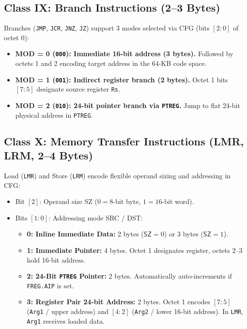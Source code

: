 \documentclass[11pt,a4paper]{article}
\newcommand{\reg}[1]{\texttt{#1}}
\newcommand{\bits}[1]{\texttt{#1}}
\newcommand{\field}[1]{\textsf{#1}}
\begin{document}
\subsection{Class IX: Branch Instructions (2--3 Bytes)}
Branches (\texttt{JMP}, \texttt{JCR}, \texttt{JNZ}, \texttt{JZ}) support 3 modes selected via \field{CFG} (bits $[2:0]$ of octet 0):
\begin{itemize}
  \item \textbf{MOD = 0 (\bits{000}): Immediate 16-bit address (3 bytes).} Followed by octets 1 and 2 encoding target address in the 64-KB code space.
  \item \textbf{MOD = 1 (\bits{001}): Indirect register branch (2 bytes).} Octet 1 bits $[7:5]$ designate source register \reg{Rs}.
  \item \textbf{MOD = 2 (\bits{010}): 24-bit pointer branch via \reg{PTREG}.} Jump to flat 24-bit physical address in \reg{PTREG}.
\end{itemize}

\subsection{Class X: Memory Transfer Instructions (LMR, LRM, 2--4 Bytes)}
Load (\texttt{LMR}) and Store (\texttt{LRM}) encode flexible operand sizing and addressing in \field{CFG}:
\begin{itemize}
  \item Bit $[2]$: Operand size \field{SZ} ($0 = 8$-bit byte, $1 = 16$-bit word).
  \item Bits $[1:0]$: Addressing mode \field{SRC} / \field{DST}:
    \begin{itemize}
      \item \textbf{0: Inline Immediate Data:} 2 bytes ($\field{SZ}=0$) or 3 bytes ($\field{SZ}=1$).
      \item \textbf{1: Immediate Pointer:} 4 bytes. Octet 1 designates register, octets 2--3 hold 16-bit address.
      \item \textbf{2: 24-Bit \reg{PTREG} Pointer:} 2 bytes. Automatically auto-increments if \texttt{FREG.AIP} is set.
      \item \textbf{3: Register Pair 24-bit Address:} 2 bytes. Octet 1 encodes $[7:5]$ (\reg{Arg1} / upper address) and $[4:2]$ (\reg{Arg2} / lower 16-bit address). In \texttt{LMR}, \reg{Arg1} receives loaded data.
    \end{itemize}
\end{itemize}
\end{document}
